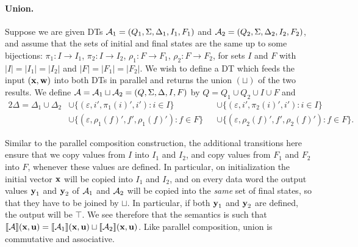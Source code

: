 \paragraph*{Union.}
Suppose we are given DTs $\mathcal{A}_1 = (Q_{1}, \Sigma, \Delta_{1}, I_{1}, F_{1})$ and $\mathcal{A}_2 = (Q_{2}, \Sigma, \Delta_{2}, I_{2}, F_{2})$, and assume that the sets of initial and final states are the same up to some bijections: $\pi_1: I \to I_1$, $\pi_2: I \to I_2$, $\rho_1: F \to F_1$, $\rho_2: F \to F_2$, for sets $I$ and $F$ with $|I| = |I_1| = |I_2|$ and $|F| = |F_1| = |F_2|$. We wish to define a DT which feeds the input $(\textbf{x},\textbf{w})$ into both DTs in parallel and returns the union $(\sqcup)$ of the two results.
We define $\mathcal{A} = \mathcal{A}_1 \sqcup \mathcal{A}_2 = (Q, \Sigma, \Delta, I, F){}$ by $Q = Q_1 \cup Q_2 \cup I \cup F$ and
\begin{alignat*}{2}
\Delta = \Delta_1 \cup \Delta_2
    &\cup \big\{(\varepsilon, i', \pi_1(i)', i') : i \in I \big\}
    &&\cup \big\{(\varepsilon, i', \pi_2(i)', i') : i \in I \big\} \\
    &\cup \big\{(\varepsilon, \rho_1(f)', f', \rho_1(f)') : f \in F \big\}
    &&\cup \big\{(\varepsilon, \rho_2(f)', f', \rho_2(f)') : f \in F \big\}.
\end{alignat*}

Similar to the parallel composition construction, the additional transitions here ensure that we copy values from $I$ into $I_1$ and $I_2$, and copy values from $F_1$ and $F_2$ into $F$, whenever these values are defined. In particular, on initialization the initial vector $\textbf{x}$ will be copied into $I_1$ and $I_2$, and on every data word the output values $\textbf{y}_1$ and $\textbf{y}_2$ of $\mathcal{A}_1$ and $\mathcal{A}_2$ will be copied into the \emph{same} set of final states, so that they have to be joined by $\sqcup$. In particular, if both $\textbf{y}_1$ and $\textbf{y}_2$ are defined, the output will be $\top$. We see therefore that the semantics is such that $\llbracket \mathcal{A} \rrbracket(\textbf{x},\textbf{u}) = \llbracket \mathcal{A}_1 \rrbracket(\textbf{x},\textbf{u}) \sqcup \llbracket \mathcal{A}_2 \rrbracket(\textbf{x},\textbf{u})$. Like parallel composition, union is commutative and associative.

\begin{figure*}[h]

\label{fig:union}
\end{figure*}

